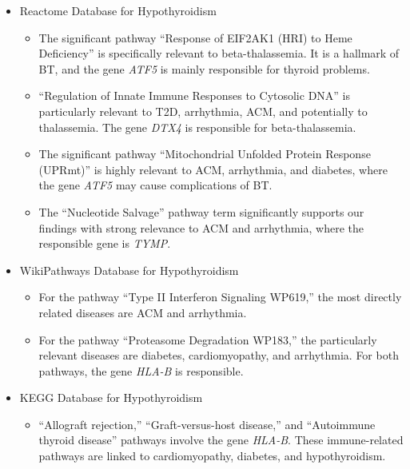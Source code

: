 \begin{itemize}
    \item Reactome Database for Hypothyroidism
    \begin{itemize}
        \item The significant pathway ``Response of EIF2AK1 (HRI) to Heme Deficiency'' is specifically relevant to beta-thalassemia. It is a hallmark of BT, and the gene \textit{ATF5} is mainly responsible for thyroid problems.
        \item ``Regulation of Innate Immune Responses to Cytosolic DNA'' is particularly relevant to T2D, arrhythmia, ACM, and potentially to thalassemia. The gene \textit{DTX4} is responsible for beta-thalassemia.
        \item The significant pathway ``Mitochondrial Unfolded Protein Response (UPRmt)'' is highly relevant to ACM, arrhythmia, and diabetes, where the gene \textit{ATF5} may cause complications of BT.
        \item The ``Nucleotide Salvage'' pathway term significantly supports our findings with strong relevance to ACM and arrhythmia, where the responsible gene is \textit{TYMP}.
    \end{itemize}

    \item WikiPathways Database for Hypothyroidism
    \begin{itemize}
        \item For the pathway ``Type II Interferon Signaling WP619,'' the most directly related diseases are ACM and arrhythmia.
        \item For the pathway ``Proteasome Degradation WP183,'' the particularly relevant diseases are diabetes, cardiomyopathy, and arrhythmia. For both pathways, the gene \textit{HLA-B} is responsible.
    \end{itemize}

    \item KEGG Database for Hypothyroidism
    \begin{itemize}
        \item ``Allograft rejection,'' ``Graft-versus-host disease,'' and ``Autoimmune thyroid disease'' pathways involve the gene \textit{HLA-B}. These immune-related pathways are linked to cardiomyopathy, diabetes, and hypothyroidism.
    \end{itemize}
\end{itemize}

